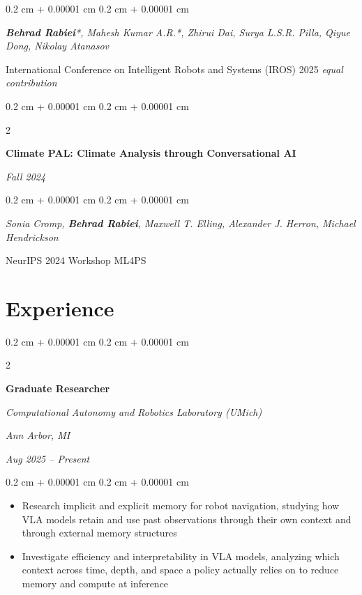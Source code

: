 \documentclass[10pt, letterpaper]{article}
\newenvironment{highlights}{
    \begin{itemize}[
        topsep=0.10 cm,
        parsep=0.10 cm,
        partopsep=0pt,
        itemsep=0pt,
        leftmargin=0.4 cm + 10pt
    ]
}{
    \end{itemize}
} %
\newenvironment{onecolentry}{
    \begin{adjustwidth}{
        0.2 cm + 0.00001 cm
    }{
        0.2 cm + 0.00001 cm
    }
}{
    \end{adjustwidth}
} %
\newenvironment{twocolentry}[2][]{
    \needspace{5\baselineskip}%
    \onecolentry
    \def\secondColumn{#2}
    \setcolumnwidth{\fill, 4.5 cm}
    \begin{paracol}{2}
}{
    \switchcolumn \raggedleft \secondColumn
    \end{paracol}
    \endonecolentry
} %
\let\hrefWithoutArrow\href
\renewcommand{\href}[2]{\hrefWithoutArrow{#1}{\ifthenelse{\equal{#2}{}}{ }{#2 }\raisebox{.15ex}{\footnotesize \faExternalLink*}}}
\begin{document}
\begin{samepage}
    \begin{onecolentry}
        \textit{\textbf{Behrad Rabiei}*, Mahesh Kumar A.R.*, Zhirui Dai, Surya L.S.R. Pilla, Qiyue Dong, Nikolay Atanasov}

        \vspace{0.10 cm}

        International Conference on Intelligent Robots and Systems (IROS) 2025 \hfill \textit{\small * equal contribution}
    \end{onecolentry}

\vspace{0.20 cm}

    \begin{twocolentry}{
         \textit{\href{https://ml4physicalsciences.github.io/2024/files/NeurIPS_ML4PS_2024_14.pdf}{PDF}
         \quad
         \textit{Fall 2024}}
    }
        \textbf{Climate PAL: Climate Analysis through Conversational AI}

    \end{twocolentry}

    \vspace{0.10 cm}

    \begin{onecolentry}
        \textit{Sonia Cromp, \textbf{Behrad Rabiei}, Maxwell T. Elling, Alexander J. Herron, Michael Hendrickson}

        \vspace{0.10 cm}

        NeurIPS 2024 Workshop ML4PS 
    \end{onecolentry}

\end{samepage}


    \section{Experience}
    \begin{twocolentry}{
    \textit{Ann Arbor, MI}    
        
    \textit{Aug 2025 – Present}}
    \textbf{Graduate Researcher}
    
    \textit{Computational Autonomy and Robotics Laboratory (UMich)}
\end{twocolentry}

\vspace{0.10 cm}
\begin{onecolentry}
    \begin{highlights}
        \item Research implicit and explicit memory for robot navigation, studying how VLA models retain and use past observations through their own context and through external memory structures
        \item Investigate efficiency and interpretability in VLA models, analyzing which context across time, depth, and space a policy actually relies on to reduce memory and compute at inference
    \end{highlights}
\end{onecolentry}
\end{document}
